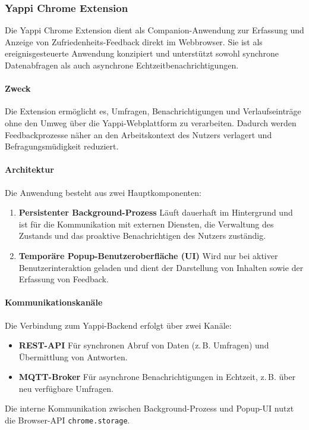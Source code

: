 \documentclass[12pt,a4paper]{report}
\begin{document}
\subsubsection{Yappi Chrome Extension}

Die Yappi Chrome Extension dient als Companion-Anwendung zur Erfassung und Anzeige von Zufriedenheits-Feedback direkt im Webbrowser.
Sie ist als ereignisgesteuerte Anwendung konzipiert und unterstützt sowohl synchrone Datenabfragen als auch asynchrone Echtzeitbenachrichtigungen.

\paragraph{Zweck}
Die Extension ermöglicht es, Umfragen, Benachrichtigungen und Verlaufseinträge ohne den Umweg über die Yappi-Webplattform zu verarbeiten.
Dadurch werden Feedbackprozesse näher an den Arbeitskontext des Nutzers verlagert und Befragungsmüdigkeit reduziert.

\paragraph{Architektur}
Die Anwendung besteht aus zwei Hauptkomponenten:
\begin{enumerate}
  \item \textbf{Persistenter Background-Prozess}
        Läuft dauerhaft im Hintergrund und ist für die Kommunikation mit externen Diensten, die Verwaltung des Zustands
        und das proaktive Benachrichtigen des Nutzers zuständig.
  \item \textbf{Temporäre Popup-Benutzeroberfläche (UI)}
        Wird nur bei aktiver Benutzerinteraktion geladen und dient der Darstellung von Inhalten sowie der Erfassung von Feedback.
\end{enumerate}

\paragraph{Kommunikationskanäle}
Die Verbindung zum Yappi-Backend erfolgt über zwei Kanäle:
\begin{itemize}
  \item \textbf{REST-API} Für synchronen Abruf von Daten (z.\,B. Umfragen) und Übermittlung von Antworten.
  \item \textbf{MQTT-Broker} Für asynchrone Benachrichtigungen in Echtzeit, z.\,B. über neu verfügbare Umfragen.
\end{itemize}
Die interne Kommunikation zwischen Background-Prozess und Popup-UI nutzt die Browser-API \texttt{chrome.storage}.
\end{document}
